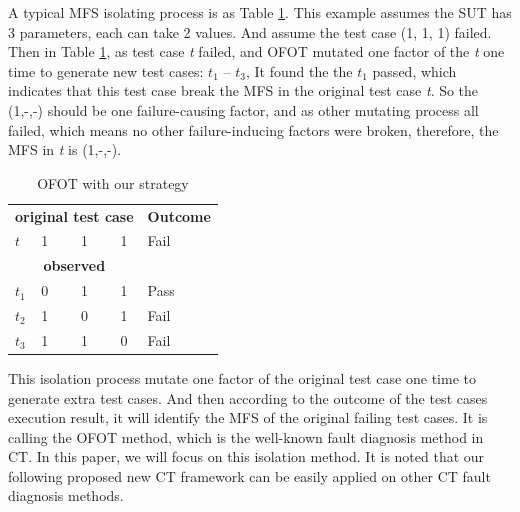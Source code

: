 \documentclass{sig-alternate}
\begin{document}
A typical MFS isolating process is as Table \ref{ofot-identify}. This example assumes the SUT has 3 parameters, each can take 2 values. And assume the test case (1, 1, 1) failed. Then in Table \ref{ofot-identify}, as test case \emph{t} failed, and OFOT mutated one factor of the \emph{t} one time to generate new test cases: $t_{1}$ -- $t_{3}$, It found the the $t_{1}$ passed, which indicates that this test case break the MFS in the original test case \emph{t}. So the (1,-,-) should be one failure-causing factor, and as other mutating process all failed, which means no other failure-inducing factors were broken, therefore, the MFS in \emph{t} is (1,-,-).

\begin{table}[h]
\caption{OFOT with our strategy}
\label{ofot-identify}
\center
\begin{tabular}{llllll}
\multicolumn{5}{c}{\bfseries original test case} & \bfseries Outcome \\
 $t$ & \multicolumn{4}{l}{1 \ \ \ \ 1 \ \ \ \  1 } & Fail \\
 \hline
\multicolumn{5}{c}{\bfseries observed} &  \\
$t_{1}$ &\multicolumn{4}{l}{0  \ \ \ \  1 \ \ \ \  1 }& Pass \\
$t_{2}$ &\multicolumn{4}{l}{1  \ \ \ \  0 \ \ \ \  1 } & Fail \\
$t_{3}$ &\multicolumn{4}{l}{1  \ \ \ \  1 \ \ \ \  0 } & Fail \\
\end{tabular}
\end{table}

This isolation process mutate one factor of the original test case one time to generate extra test cases. And then according to the outcome of the test cases execution result, it will identify the MFS of the original failing test cases. It is calling the OFOT method, which is the well-known fault diagnosis method in CT. In this paper, we will focus on this isolation method. It is noted that our following proposed new CT framework can be easily applied on other CT fault diagnosis methods.

\end{document}
